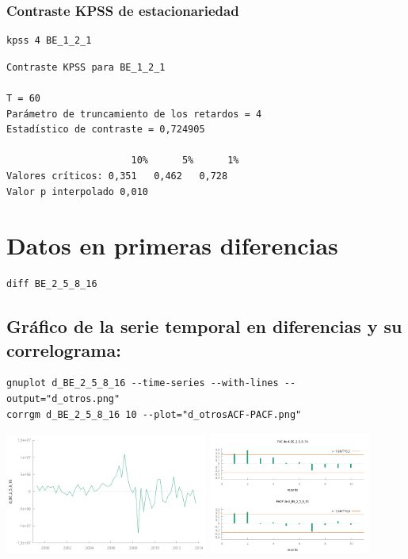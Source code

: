 \documentclass[10pt]{article}
\begin{document}
\subsubsection*{Contraste KPSS de estacionariedad}
\label{sec:org8a449ce}

\begin{verbatim}
kpss 4 BE_1_2_1
\end{verbatim}

\begin{verbatim}
Contraste KPSS para BE_1_2_1

T = 60
Parámetro de truncamiento de los retardos = 4
Estadístico de contraste = 0,724905

                      10%      5%      1%
Valores críticos: 0,351   0,462   0,728
Valor p interpolado 0,010
\end{verbatim}
\section*{Datos en primeras diferencias}
\label{sec:org13cda42}

\begin{verbatim}
diff BE_2_5_8_16
\end{verbatim}
\subsection*{Gráfico de la serie temporal en diferencias y su correlograma:}
\label{sec:orgd8e836a}

\begin{verbatim}
gnuplot d_BE_2_5_8_16 --time-series --with-lines --output="d_otros.png"
corrgm d_BE_2_5_8_16 10 --plot="d_otrosACF-PACF.png"
\end{verbatim}

\begin{center}
\includegraphics[width=0.5\textwidth]{./SerieCuentasFinancierasBE/d_otros.png} 
\includegraphics[width=0.4\textwidth]{./SerieCuentasFinancierasBE/d_otrosACF-PACF.png}
\end{center}
\end{document}
